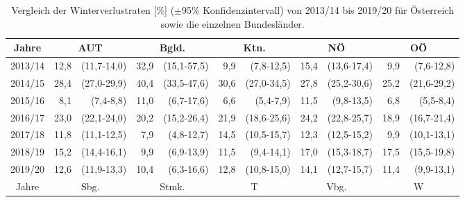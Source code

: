 \begin{table}[H]
    \caption{Vergleich der Winterverlustraten [\%] (\(\pm \)95\% Konfidenzintervall) von 2013/14 bis 2019/20 für Österreich sowie die einzelnen Bundesländer.}
    \centering
    \scriptsize
    \label{tab:u:states-year}
    \begin{tabular}{|c|*{5}{rr|}}
        \hline    
        \multicolumn{1}{|c|}{Jahre} & 
        \multicolumn{2}{c|}{AUT}   & 
        \multicolumn{2}{c|}{Bgld.} & 
        \multicolumn{2}{c|}{Ktn.}  &  
        \multicolumn{2}{c|}{NÖ}    & 
        \multicolumn{2}{c|}{OÖ}    \\
        \hline
        
	    2013/14 & 12,8 & (11,7-14,0) & 32,9 & (15,1-57,5) &  9,9 &  (7,8-12,5) & 15,4 & (13,6-17,4) &  9,9 &  (7,6-12,8) \\
        2014/15 & 28,4 & (27,0-29,9) & 40,4 & (33,5-47,6) & 30,6 & (27,0-34,5) & 27,8 & (25,2-30,6) & 25,2 & (21,6-29,2) \\
        2015/16 &  8,1 &   (7,4-8,8) & 11,0 &  (6,7-17,6) &  6,6 &   (5,4-7,9) & 11,5 &  (9,8-13,5) &  6,8 &   (5,5-8,4) \\
        2016/17 & 23,0 & (22,1-24,0) & 20,2 & (15,2-26,4) & 21,9 & (18,6-25,6) & 24,2 & (22,8-25,7) & 18,9 & (16,7-21,4) \\
        2017/18 & 11,8 & (11,1-12,5) &  7,9 &  (4,8-12,7) & 14,5 & (10,5-15,7) & 12,3 & (12,5-15,2) &  9,9 & (10,1-13,1) \\
        2018/19 & 15,2 & (14,4-16,1) &  9,9 &  (6,9-13,9) & 11,5 &  (9,4-14,1) & 17,0 & (15,3-18,7) & 17,5 & (15,5-19,8) \\
        2019/20 & 12,6 & (11,9-13,3) & 10,4 &  (6,3-16,6) & 12,8 & (10,8-15,0) & 14,1 & (12,7-15,7) & 11,4 &  (9,9-13,1) \\

        \hline    
        \multicolumn{1}{|c|}{Jahre} & 
        \multicolumn{2}{c|}{Sbg.}  & 
        \multicolumn{2}{c|}{Stmk.} &
        \multicolumn{2}{c|}{T}     &
        \multicolumn{2}{c|}{Vbg.}  &
        \multicolumn{2}{c|}{W}     \\
        \hline


\end{tabular}
\end{table}
